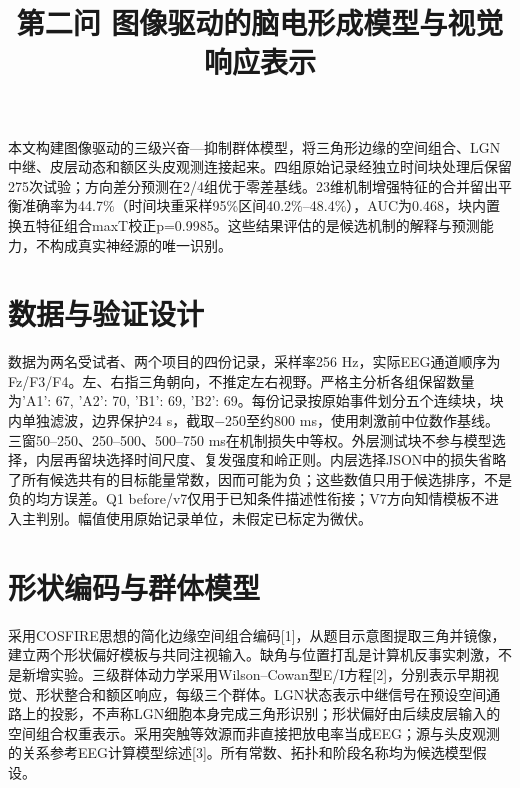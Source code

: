 \documentclass[UTF8,a4paper,11pt]{ctexart}
\begin{document}
\title{第二问 图像驱动的脑电形成模型与视觉响应表示}\author{}\date{}\maketitle

本文构建图像驱动的三级兴奋—抑制群体模型，将三角形边缘的空间组合、LGN中继、皮层动态和额区头皮观测连接起来。四组原始记录经独立时间块处理后保留275次试验；方向差分预测在2/4组优于零差基线。23维机制增强特征的合并留出平衡准确率为44.7\%（时间块重采样95\%区间40.2\%–48.4\%），AUC为0.468，块内置换五特征组合maxT校正p=0.9985。这些结果评估的是候选机制的解释与预测能力，不构成真实神经源的唯一识别。

\section{数据与验证设计}

数据为两名受试者、两个项目的四份记录，采样率256 Hz，实际EEG通道顺序为Fz/F3/F4。左、右指三角朝向，不推定左右视野。严格主分析各组保留数量为{'A1': 67, 'A2': 70, 'B1': 69, 'B2': 69}。每份记录按原始事件划分五个连续块，块内单独滤波，边界保护24 s，截取−250至约800 ms，使用刺激前中位数作基线。三窗50–250、250–500、500–750 ms在机制损失中等权。外层测试块不参与模型选择，内层再留块选择时间尺度、复发强度和岭正则。内层选择JSON中的损失省略了所有候选共有的目标能量常数，因而可能为负；这些数值只用于候选排序，不是负的均方误差。Q1 before/v7仅用于已知条件描述性衔接；V7方向知情模板不进入主判别。幅值使用原始记录单位，未假定已标定为微伏。

\section{形状编码与群体模型}

采用COSFIRE思想的简化边缘空间组合编码[1]，从题目示意图提取三角并镜像，建立两个形状偏好模板与共同注视输入。缺角与位置打乱是计算机反事实刺激，不是新增实验。三级群体动力学采用Wilson–Cowan型E/I方程[2]，分别表示早期视觉、形状整合和额区响应，每级三个群体。LGN状态表示中继信号在预设空间通路上的投影，不声称LGN细胞本身完成三角形识别；形状偏好由后续皮层输入的空间组合权重表示。采用突触等效源而非直接把放电率当成EEG；源与头皮观测的关系参考EEG计算模型综述[3]。所有常数、拓扑和阶段名称均为候选模型假设。
\end{document}
